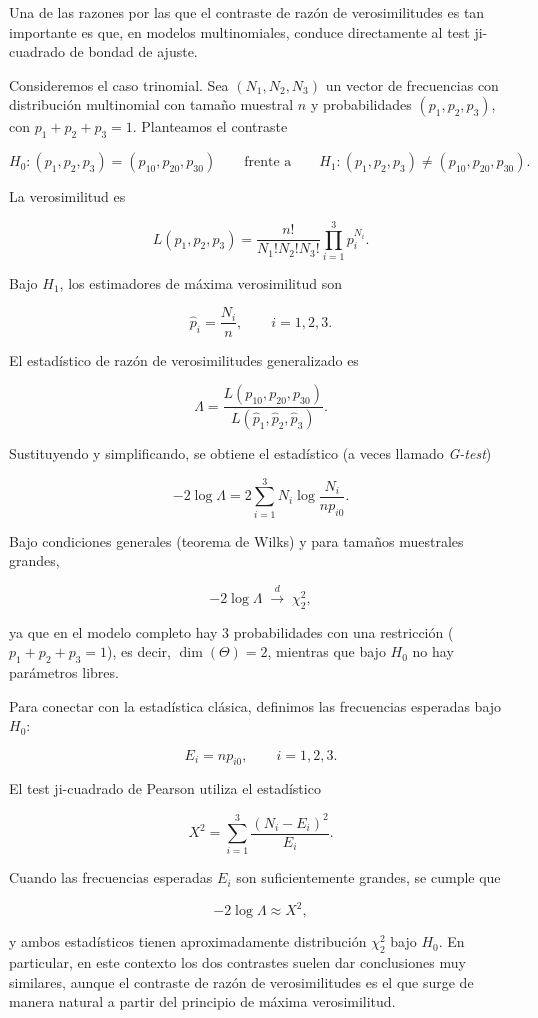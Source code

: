 \documentclass[
]{article}
\begin{document}
Una de las razones por las que el contraste de razón de verosimilitudes es tan importante es que, en modelos multinomiales, conduce directamente al test ji-cuadrado de bondad de ajuste.

Consideremos el caso trinomial. Sea \((N_1,N_2,N_3)\) un vector de frecuencias con distribución multinomial con tamaño muestral \(n\) y probabilidades \((p_1,p_2,p_3)\), con \(p_1+p_2+p_3=1\). Planteamos el contraste

\[
H_0:(p_1,p_2,p_3)=(p_{10},p_{20},p_{30})
\qquad \text{frente a} \qquad
H_1:(p_1,p_2,p_3)\neq(p_{10},p_{20},p_{30}).
\]

La verosimilitud es

\[
L(p_1,p_2,p_3)
=
\frac{n!}{N_1!N_2!N_3!}
\prod_{i=1}^3 p_i^{N_i}.
\]

Bajo \(H_1\), los estimadores de máxima verosimilitud son

\[
\hat p_i=\frac{N_i}{n},\qquad i=1,2,3.
\]

El estadístico de razón de verosimilitudes generalizado es

\[
\Lambda
=
\frac{L(p_{10},p_{20},p_{30})}{L(\hat p_1,\hat p_2,\hat p_3)}.
\]

Sustituyendo y simplificando, se obtiene el estadístico (a veces llamado \emph{G-test})

\[
-2\log\Lambda
=
2\sum_{i=1}^3 N_i\log\frac{N_i}{n p_{i0}}.
\]

Bajo condiciones generales (teorema de Wilks) y para tamaños muestrales grandes,

\[
-2\log\Lambda \;\xrightarrow{d}\; \chi^2_2,
\]

ya que en el modelo completo hay \(3\) probabilidades con una restricción (\(p_1+p_2+p_3=1\)), es decir, \(\dim(\Theta)=2\), mientras que bajo \(H_0\) no hay parámetros libres.

Para conectar con la estadística clásica, definimos las frecuencias esperadas bajo \(H_0\):

\[
E_i=n p_{i0},\qquad i=1,2,3.
\]

El test ji-cuadrado de Pearson utiliza el estadístico

\[
X^2=\sum_{i=1}^3 \frac{(N_i-E_i)^2}{E_i}.
\]

Cuando las frecuencias esperadas \(E_i\) son suficientemente grandes, se cumple que

\[
-2\log\Lambda \approx X^2,
\]

y ambos estadísticos tienen aproximadamente distribución \(\chi^2_2\) bajo \(H_0\). En particular, en este contexto los dos contrastes suelen dar conclusiones muy similares, aunque el contraste de razón de verosimilitudes es el que surge de manera natural a partir del principio de máxima verosimilitud.
\end{document}
